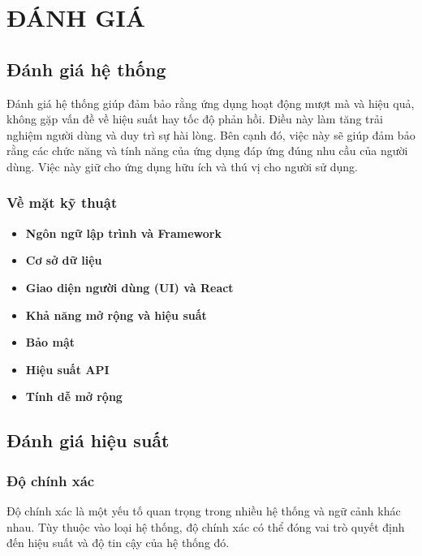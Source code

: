 \section{ĐÁNH GIÁ}
\subsection{Đánh giá hệ thống }

Đánh giá hệ thống giúp đảm bảo rằng ứng dụng hoạt động mượt mà và hiệu quả, không gặp vấn đề về hiệu suất hay tốc độ phản hồi. Điều này làm tăng trải nghiệm người dùng và duy trì sự hài lòng. Bên cạnh đó, việc này sẽ giúp đảm bảo rằng các chức năng và tính năng của ứng dụng đáp ứng đúng nhu cầu của người dùng. Việc này giữ cho ứng dụng hữu ích và thú vị cho người sử dụng.	

\subsubsection{Về mặt kỹ thuật}

\begin{itemize}
    \item \textbf{Ngôn ngữ lập trình và Framework}
    
 
    \item \textbf{Cơ sở dữ liệu} 
    
    
    \item \textbf{Giao diện người dùng (UI) và React}

    
    \item \textbf{Khả năng mở rộng và hiệu suất}
    
    
    \item \textbf{Bảo mật}

    
    \item \textbf{Hiệu suất API}
    
    
    \item \textbf{Tính dễ mở rộng}

\end{itemize}

\subsection{Đánh giá hiệu suất }
\subsubsection{Độ chính xác}
Độ chính xác là một yếu tố quan trọng trong nhiều hệ thống và ngữ cảnh khác nhau. Tùy thuộc vào loại hệ thống, độ chính xác có thể đóng vai trò quyết định đến hiệu suất và độ tin cậy của hệ thống đó. \\

